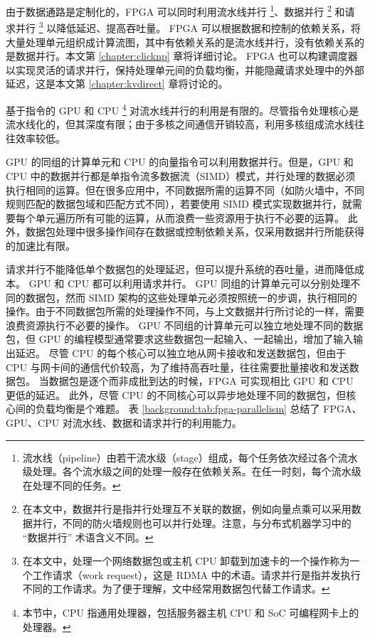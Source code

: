 


由于数据通路是定制化的，FPGA 可以同时利用流水线并行 \footnote{流水线（pipeline）由若干流水级（stage）组成，每个任务依次经过各个流水级处理。各个流水级之间的处理一般存在依赖关系。在任一时刻，每个流水级在处理不同的任务。}、数据并行 \footnote{在本文中，数据并行是指并行处理互不关联的数据，例如向量点乘可以采用数据并行，不同的防火墙规则也可以并行处理。注意，与分布式机器学习中的 ``数据并行'' 术语含义不同。} 和请求并行 \footnote{在本文中，处理一个网络数据包或主机 CPU 卸载到加速卡的一个操作称为一个工作请求（work request），这是 RDMA 中的术语。请求并行是指并发执行不同的工作请求。为了便于理解，文中经常用数据包代替工作请求。} 以降低延迟、提高吞吐量。
FPGA 可以根据数据和控制的依赖关系，将大量处理单元组织成计算流图，其中有依赖关系的是流水线并行，没有依赖关系的是数据并行。本文第 \ref{chapter:clicknp} 章将详细讨论。
FPGA 也可以构建调度器以实现灵活的请求并行，保持处理单元间的负载均衡，并能隐藏请求处理中的外部延迟，这是本文第 \ref{chapter:kvdirect} 章将讨论的。

基于指令的 GPU 和 CPU \footnote{本节中，CPU 指通用处理器，包括服务器主机 CPU 和 SoC 可编程网卡上的处理器。} 对流水线并行的利用是有限的。尽管指令处理核心是流水线化的，但其深度有限；由于多核之间通信开销较高，利用多核组成流水线往往效率较低。

GPU 的同组的计算单元和 CPU 的向量指令可以利用数据并行。但是，GPU 和 CPU 中的数据并行都是单指令流多数据流（SIMD）模式，并行处理的数据必须执行相同的运算。但在很多应用中，不同数据所需的运算不同（如防火墙中，不同规则匹配的数据包域和匹配方式不同），若要使用 SIMD 模式实现数据并行，就需要每个单元遍历所有可能的运算，从而浪费一些资源用于执行不必要的运算。
此外，数据包处理中很多操作间存在数据或控制依赖关系，仅采用数据并行所能获得的加速比有限。

请求并行不能降低单个数据包的处理延迟，但可以提升系统的吞吐量，进而降低成本。
GPU 和 CPU 都可以利用请求并行。
GPU 同组的计算单元可以分别处理不同的数据包，然而 SIMD 架构的这些处理单元必须按照统一的步调，执行相同的操作。由于不同数据包所需的处理操作不同，与上文数据并行所讨论的一样，需要浪费资源执行不必要的操作。
GPU 不同组的计算单元可以独立地处理不同的数据包，但 GPU 的编程模型通常要求这些数据包一起输入、一起输出，增加了输入输出延迟。
尽管 CPU 的每个核心可以独立地从网卡接收和发送数据包，但由于 CPU 与网卡间的通信代价较高，为了维持高吞吐量，往往需要批量接收和发送数据包。
当数据包是逐个而非成批到达的时候，FPGA 可实现相比 GPU 和 CPU 更低的延迟。
此外，尽管 CPU 的不同核心可以异步地处理不同的数据包，但核心间的负载均衡是个难题。
表 \ref{background:tab:fpga-parallelism} 总结了 FPGA、GPU、CPU 对流水线、数据和请求并行的利用能力。

